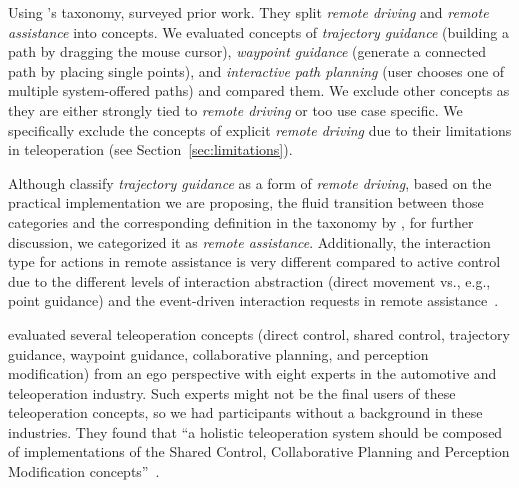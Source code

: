 Using \citet{bogdoll_taxonomy_2022}'s taxonomy, \citet{majstorovic_survey_2022} surveyed prior work. They split \textit{remote driving} and \textit{remote assistance} into concepts. We evaluated concepts of \textit{trajectory guidance} (building a path by dragging the mouse cursor), \textit{waypoint guidance} (generate a connected path by placing single points), and \textit{interactive path planning} (user chooses one of multiple system-offered paths) and compared them. We exclude other concepts as they are either strongly tied to \textit{remote driving} or too use case specific. We specifically exclude the concepts of explicit \textit{remote driving} due to their limitations in teleoperation (see Section~\ref{sec:limitations}). %

Although \citet{majstorovic_survey_2022} classify \textit{trajectory guidance} as a form of \textit{remote driving}, based on the practical implementation we are proposing, the fluid transition between those categories and the corresponding definition in the taxonomy by \citet{bogdoll_taxonomy_2022}, for further discussion, we categorized it as \textit{remote assistance}.
Additionally, the interaction type for actions in remote assistance is very different compared to active control due to the different levels of interaction abstraction (direct movement vs., e.g., point guidance) and the event-driven interaction requests in remote assistance~\cite{majstorovic_survey_2022}. 

\citet{brecht2024evaluation} evaluated several teleoperation concepts (direct control, shared control, trajectory guidance, waypoint guidance, collaborative planning, and perception modification) from an ego perspective with eight experts in the automotive and teleoperation industry. Such experts might not be the final users of these teleoperation concepts, so we had participants without a background in these industries. They found that ``a holistic teleoperation system should be composed of implementations of the Shared Control, Collaborative Planning and Perception Modification concepts''~\cite[p. 639]{brecht2024evaluation}.



